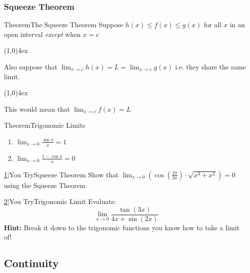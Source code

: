 \documentclass{MathNotes}
\newenvironment{theorem}[1]{\begin{GrayBox}{Theorem}{#1}}{\end{GrayBox}}
\newenvironment{practice}[2]{\begin{PurpleBox}{\texorpdfstring{#1}\Big|You Try}{#2}}{\end{PurpleBox}}
\newcommand{\br}{
	\begin{center}
		\line(1,0){4ex}
	\end{center}}
\begin{document}
\newpage
\subsubsection{Squeeze Theorem}\label{sec:squeeze-theorem}

\begin{multicols}{2}[]
	\begin{theorem}{The Squeeze Theorem}\label{th:squeeze-theorem}
		Suppose $h(x)\leq f(x) \leq g(x)$ for all $x$ in an open interval
		\textit{except} when $x=c$
		\br

		Also suppose that $\displaystyle\lim_{x\to c}h(x)=L=\lim_{x\to c}g(x)$ i.e. they share
		the same limit.
		\br

		This would mean that $\lim_{x\to c}f(x)=L$
	\end{theorem}

	\begin{theorem}{Trigonomic Limits}\label{th:trigonomic-limits}
		\begin{enumerate}
			\item $\displaystyle\lim_{x\to 0}\frac{\sin x}{x} = 1$
			\item $\displaystyle\lim_{x\to 0}\frac{1 - \cos x}{x} = 0$
		\end{enumerate}
	\end{theorem}

	\centering
	
\end{multicols}

\begin{practice}{\hyperref[ans:squeeze-theorem]{1}}{Squeeze Theorem}\label{prac:squeeze-theorem}
	Show that
	$\displaystyle\lim_{x\to 0}(\cos(\frac{2\pi}{3x})\cdot\sqrt{x^3+x^2})=0$
	using the Squeeze Theorem
\end{practice}
\begin{practice}{\hyperref[ans:trigonomic-limit]{2}}{Trigonomic Limit}\label{prac:trigonomic-limit}
	Evaluate:
	$$\lim_{x\to 0}\frac{\tan(3x)}{4x+\sin(2x)}$$
	\textbf{Hint:} Break it down to the trigonomic functions you know
	how to take a limit of!
\end{practice}

\subsection{Continuity}\label{sec:continuity}
\end{document}
